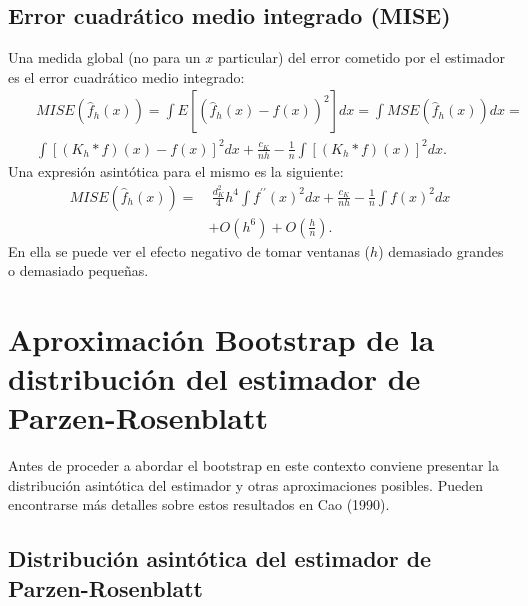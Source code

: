 \documentclass[
]{book}
\theoremstyle{break}
\theoremstyle{definition}
\theoremstyle{definition}
\theoremstyle{definition}
\theoremstyle{definition}
\theoremstyle{remark}
\begin{document}
\hypertarget{error-cuadruxe1tico-medio-integrado-mise}{%
\subsection{Error cuadrático medio integrado (MISE)}\label{error-cuadruxe1tico-medio-integrado-mise}}

Una medida global (no para un \(x\) particular) del error cometido por el
estimador es el error cuadrático medio integrado:
\[\begin{aligned}
& & MISE\left( \hat{f}_{h}\left( x \right) \right) =\int E\left[ \left( \hat{f}
_{h}\left( x \right) -f\left( x \right) \right)^2\right] dx=\int MSE\left( 
\hat{f}_{h}\left( x \right) \right) dx= \\
&&\int \left[ \left( K_{h}\ast f \right) \left( x \right) -f\left( x \right) 
\right]^2dx+\frac{c_{K}}{nh}-\frac{1}{n}\int \left[ \left( K_{h}\ast
f \right) \left( x \right) \right]^2dx.
\end{aligned}\]
Una expresión asintótica para el mismo es la siguiente:
\[\begin{aligned}
MISE\left( \hat{f}_{h}\left( x \right) \right) =&\ \frac{d_{K}^2}{4}h^4\int
f^{\prime \prime }\left( x \right)^2dx+\frac{c_{K}}{nh}-\frac{1}{n}\int
f\left( x \right)^2dx \\
&+O\left( h^{6} \right) +O \left( \frac{h}{n} \right).
\end{aligned}\]
En ella se puede ver el efecto negativo de tomar ventanas (\(h\)) demasiado
grandes o demasiado pequeñas.

\hypertarget{aproximacion-bootstrap}{%
\section{Aproximación Bootstrap de la distribución del estimador de Parzen-Rosenblatt}\label{aproximacion-bootstrap}}

Antes de proceder a abordar el bootstrap en este contexto conviene
presentar la distribución asintótica del estimador y otras
aproximaciones posibles. Pueden encontrarse más detalles sobre estos
resultados en Cao (1990).

\hypertarget{distribuciuxf3n-asintuxf3tica-del-estimador-de-parzen-rosenblatt}{%
\subsection{Distribución asintótica del estimador de Parzen-Rosenblatt}\label{distribuciuxf3n-asintuxf3tica-del-estimador-de-parzen-rosenblatt}}
\end{document}
